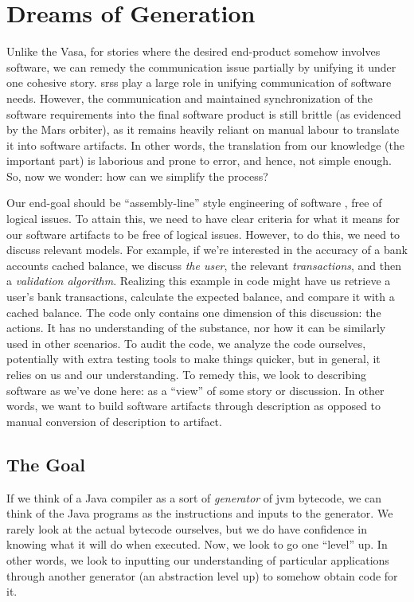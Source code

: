 \section{Dreams of Generation}
\label{chap:ideology:sec:thoughts_of_generation}

Unlike the Vasa, for stories where the desired end-product somehow involves
software, we can remedy the communication issue partially by unifying it under
one cohesive story. \Acfp{srs} play a large role in unifying communication of
software needs. However, the communication and maintained synchronization of the
software requirements into the final software product is still brittle (as
evidenced by the Mars orbiter), as it remains heavily reliant on manual labour
to translate it into software artifacts. In other words, the translation from
our knowledge (the important part) is laborious and prone to error, and hence,
not simple enough. So, now we wonder: how can we simplify the process?

Our end-goal should be ``assembly-line'' style engineering of software
\cite{well-understood}, free of logical issues. To attain this, we need to have
clear criteria for what it means for our software artifacts to be free of
logical issues. However, to do this, we need to discuss relevant models. For
example, if we're interested in the accuracy of a bank accounts cached balance,
we discuss \textit{the user}, the relevant \textit{transactions}, and then a
\textit{validation algorithm}. Realizing this example in code might have us
retrieve a user's bank transactions, calculate the expected balance, and compare
it with a cached balance. The code only contains one dimension of this
discussion: the actions. It has no understanding of the substance, nor how it
can be similarly used in other scenarios. To audit the code, we analyze the code
ourselves, potentially with extra testing tools to make things quicker, but in
general, it relies on us and our understanding. To remedy this, we look to
describing software as we've done here: as a ``view'' of some story or
discussion. In other words, we want to build software artifacts through
description as opposed to manual conversion of description to artifact.

\subsection{The Goal}
\label{chap:ideology:sec:thoughts_of_generation:subsec:the_goal}

If we think of a Java compiler as a sort of \textit{generator} of \acs{jvm}
bytecode, we can think of the Java programs as the instructions and inputs to
the generator. We rarely look at the actual bytecode ourselves, but we do have
confidence in knowing what it will do when executed. Now, we look to go one
``level'' up. In other words, we look to inputting our understanding of
particular applications through another generator (an abstraction level up) to
somehow obtain code for it.

